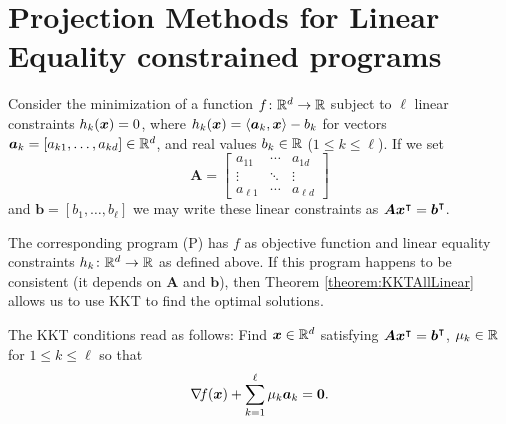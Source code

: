 
\section[Projection Methods]{Projection Methods for Linear Equality constrained programs}

Consider the minimization of a function $f\colon \mathbb{R}^d \to \mathbb{R}$ subject to $\ell$ linear constraints $h_k(\boldsymbol{x}) = 0$, where $h_k(\boldsymbol{x}) = \langle \boldsymbol{a}_k , \boldsymbol{x} \rangle - b_k$ for vectors $\boldsymbol{a}_k=[a_{k1}, \dotsc, a_{kd}] \in \mathbb{R}^d$, and real values $b_k \in \mathbb{R}$ ($1\leq k \leq \ell$).  If we set 
\begin{equation*}
\boldsymbol{A} = \begin{bmatrix} a_{11} & \dotsb & a_{1d} \\ \vdots & \ddots & \vdots \\ a_{\ell 1} & \dotsb & a_{\ell d} \end{bmatrix}
\end{equation*}
and $\boldsymbol{b} = [b_1, \dotsc, b_\ell]$ we may write these linear constraints as $\boldsymbol{A}{\boldsymbol{x}}^\intercal={\boldsymbol{b}}^\intercal$.

The corresponding program (P) has $f$ as objective function and linear equality constraints $h_k\colon \mathbb{R}^d \to \mathbb{R}$ as defined above.  If this program happens to be consistent (it depends on $\boldsymbol{A}$ and $\boldsymbol{b}$), then Theorem \ref{theorem:KKTAllLinear} allows us to use KKT to find the optimal solutions. 

The KKT conditions read as follows: Find $\boldsymbol{x} \in \mathbb{R}^d$ satisfying $\boldsymbol{A}{\boldsymbol{x}}^\intercal = {\boldsymbol{b}}^\intercal$, $\mu_k \in \mathbb{R}$ for $1 \leq k \leq \ell$ so that
\begin{equation}\label{equation:KKTforLECP}
\mathop{\nabla\! {f}}(\boldsymbol{x}) + \sum_{k=1}^\ell \mu_k \boldsymbol{a}_k = \boldsymbol{0}.
\end{equation}



